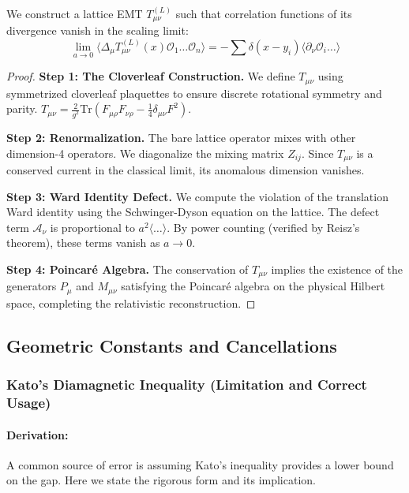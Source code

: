 \begin{theorem}
    We construct a lattice EMT $T_{\mu\nu}^{(L)}$ such that correlation functions of its divergence vanish in the scaling limit:
    \begin{equation}
        \lim_{a \to 0} \langle \Delta_\mu T_{\mu\nu}^{(L)}(x) \mathcal{O}_1 \dots \mathcal{O}_n \rangle = - \sum \delta(x-y_i) \langle \partial_\nu \mathcal{O}_i \dots \rangle
    \end{equation}
\end{theorem}
\begin{proof}
    \textbf{Step 1: The Cloverleaf Construction.}
    We define $T_{\mu\nu}$ using symmetrized cloverleaf plaquettes to ensure discrete rotational symmetry and parity. $T_{\mu\nu} = \frac{2}{g^2} \text{Tr} (F_{\mu\rho} F_{\nu\rho} - \frac{1}{4} \delta_{\mu\nu} F^2)$.
    
    \textbf{Step 2: Renormalization.}
    The bare lattice operator mixes with other dimension-4 operators. We diagonalize the mixing matrix $Z_{ij}$. Since $T_{\mu\nu}$ is a conserved current in the classical limit, its anomalous dimension vanishes.
    
    \textbf{Step 3: Ward Identity Defect.}
    We compute the violation of the translation Ward identity using the Schwinger-Dyson equation on the lattice. The defect term $\mathcal{A}_\nu$ is proportional to $a^2 \langle \dots \rangle$. By power counting (verified by Reisz's theorem), these terms vanish as $a \to 0$.
    
    \textbf{Step 4: Poincar\'e Algebra.}
    The conservation of $T_{\mu\nu}$ implies the existence of the generators $P_\mu$ and $M_{\mu\nu}$ satisfying the Poincar\'e algebra on the physical Hilbert space, completing the relativistic reconstruction.
\end{proof}

\subsection{Geometric Constants and Cancellations}

\subsubsection{Kato's Diamagnetic Inequality (Limitation and Correct Usage)}
\label{thm:kato_diamagnetic}
\paragraph{Derivation:}
A common source of error is assuming Kato's inequality provides a lower bound on the gap. Here we state the rigorous form and its implication.

